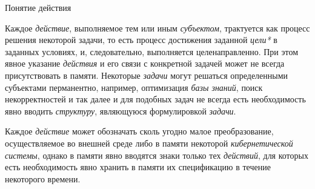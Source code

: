 \begin{frame}{Понятие действия}
\topline
\vspace{30}
 \\

 \begin{SCn}
	\begin{scnindent}
	\end{scnindent}
\end{SCn}
\end{frame}
\begin{frame}{}
    \begin{SCn}
\end{SCn}
\end{frame}

\begin{frame}{}
\justifying
Каждое \textit{действие}, выполняемое тем или иным \textit{субъектом}, трактуется как процесс решения некоторой задачи, то есть процесс достижения заданной \textit{цели*} в заданных условиях, и, следовательно, выполняется целенаправленно. При этом явное указание \textit{действия} и его связи с конкретной задачей может не всегда присутствовать в памяти. Некоторые \textit{задачи} могут решаться определенными субъектами перманентно, например, оптимизация \textit{базы знаний}, поиск некорректностей и так далее и для подобных задач не всегда есть необходимость явно вводить \textit{структуру}, являющуюся формулировкой \textit{задачи}.

Каждое \textit{действие} может обозначать сколь угодно малое преобразование, осуществляемое во внешней среде либо в памяти некоторой \textit{кибернетической системы}, однако в памяти явно вводятся знаки только тех \textit{действий}, для которых есть необходимость явно хранить в памяти их спецификацию в течение некоторого времени.
\end{frame}

